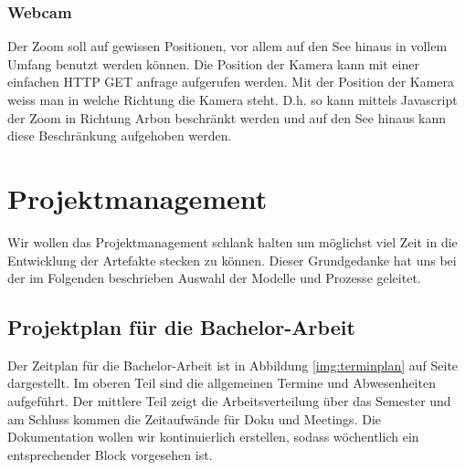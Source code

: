 \documentclass[a4paper,ngerman, 11pt, pagesize]{report}
\begin{document}
\subsection{Webcam}
Der Zoom soll auf gewissen Positionen, vor allem auf den See hinaus in vollem Umfang benutzt werden können. Die Position der Kamera kann mit einer einfachen HTTP GET anfrage aufgerufen werden. Mit der Position der Kamera weiss man in welche Richtung die Kamera steht. D.h. so kann mittels Javascript der Zoom in Richtung Arbon beschränkt werden und auf den See hinaus kann diese Beschränkung aufgehoben werden.

   


\chapter{Projektmanagement}
Wir wollen das Projektmanagement schlank halten um möglichst viel Zeit in die Entwicklung der Artefakte stecken zu können.
Dieser Grundgedanke hat uns bei der im Folgenden beschrieben Auswahl der Modelle und Prozesse geleitet.



\section{Projektplan für die Bachelor-Arbeit}
Der Zeitplan für die Bachelor-Arbeit ist in Abbildung \ref{img:terminplan} auf Seite \pageref{img:terminplan} dargestellt.
Im oberen Teil sind die allgemeinen Termine und Abwesenheiten aufgeführt. Der mittlere Teil zeigt die Arbeitsverteilung über das Semester und am Schluss kommen die Zeitaufwände für Doku und Meetings. Die Dokumentation wollen wir kontinuierlich erstellen, sodass wöchentlich ein entsprechender Block vorgesehen ist.
\newpage
\clearpage
\pagebreak
{}
\end{document}
